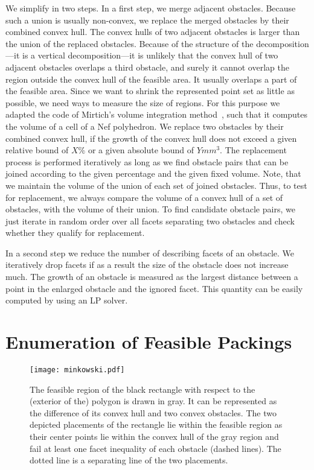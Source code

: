 \documentclass{article}
\begin{document}
We simplify in two steps. In a first step, we merge adjacent
obstacles. Because such a union is usually non-convex, we replace the
merged obstacles by their combined convex hull. The convex hulls of
two adjacent obstacles is larger than the union of the replaced
obstacles. Because of the structure of the decomposition---it is a
vertical decomposition---it is unlikely that the convex hull of two
adjacent obstacles overlaps a third obstacle, and surely it cannot
overlap the region outside the convex hull of the feasible area. It
usually overlaps a part of the feasible area. Since we want to shrink
the represented point set as little as possible, we need ways to measure
the size of regions. For this purpose we adapted the code of Mirtich's
volume integration method~\cite{m-facpm-96}, such that it computes the
volume of a cell of a Nef polyhedron. We replace two obstacles by
their combined convex hull, if the growth of the convex hull does not
exceed a given relative bound of $X\%$ or a given absolute bound of
$Ymm^3$. The replacement process is performed iteratively as long as
we find obstacle pairs that can be joined according to the given
percentage and the given fixed volume. Note, that we maintain the
volume of the union of each set of joined obstacles. Thus, to test for
replacement, we always compare the volume of a convex hull of a set of
obstacles, with the volume of their union. To find candidate obstacle
pairs, we just iterate in random order over all facets separating two
obstacles and check whether they qualify for replacement.

In a second step we reduce the number of describing facets of an
obstacle. We iteratively drop facets if as a result the size of the
obstacle does not increase much. The growth of an obstacle is measured
as the largest distance between a point in the enlarged obstacle and
the ignored facet. This quantity can be easily computed by using an
LP solver.

\section{Enumeration of Feasible Packings}
\label{sec:enumeration}

\begin{figure}[t]
\center
\texttt{[image: minkowski.pdf]}
\caption{
\label{fig:pattern}
  The feasible region of the black rectangle with respect to the
  (exterior of the) polygon is drawn in gray. It can be represented as
  the difference of its convex hull and two convex obstacles. The two
  depicted placements of the rectangle lie within the feasible region
  as their center points lie within the convex hull of the gray region
  and fail at least one facet inequality of each obstacle (dashed
  lines). The dotted line is a separating line of the two placements.}
\end{figure}
\end{document}
